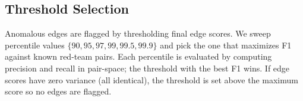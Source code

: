 \subsection{Threshold Selection}
\label{sec:threshold_selection}

Anomalous edges are flagged by thresholding final edge scores. We sweep percentile values $\{90, 95, 97, 99, 99.5, 99.9\}$ and pick the one that maximizes F1 against known red-team pairs. Each percentile is evaluated by computing precision and recall in pair-space; the threshold with the best F1 wins. If edge scores have zero variance (all identical), the threshold is set above the maximum score so no edges are flagged.
